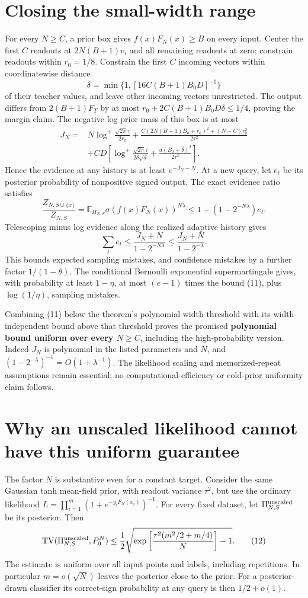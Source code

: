 \documentclass[11pt]{article}
\newcommand{\E}{\mathbb E}
\begin{document}
\section{Closing the small-width range}
For every $N\ge C$, a prior box gives $f(x)F_N(x)\ge B$ on every input.
Center the first $C$ readouts at $2N(B+1)v_i$ and all remaining readouts
at zero; constrain readouts within $r_0=1/8$. Constrain the first $C$
incoming vectors within coordinatewise distance
\[
       \delta=\min\{1,[16C(B+1)B_0D]^{-1}\}
\]
of their teacher values, and leave other incoming vectors unrestricted.
The output differs from $2(B+1)F_T$ by at most
$r_0+2C(B+1)B_0D\delta\le1/4$, proving the margin claim.
The negative log prior mass of this box is at most
\begin{align*}
 J_N={}&N\log^+\frac{\sqrt{2\pi}\tau}{2r_0}
 +\frac{C(2N(B+1)B_0+r_0)^2+(N-C)r_0^2}{2\tau^2}\\
 &+CD\left[\log^+\frac{\sqrt{2\pi}\tau}{2\delta\sqrt d}
                   +\frac{d(B_0+\delta)^2}{2\tau^2}\right].
\end{align*}
Hence the evidence at any history is at least $e^{-J_N-N}$.
At a new query, let $e_t$ be its posterior probability of nonpositive
signed output. The exact evidence ratio satisfies
\[
 \frac{Z_{N,S\cup\{x\}}}{Z_{N,S}}
 =\E_{\Pi_{N,S}}\sigma(f(x)F_N(x))^{N\lambda}
 \le1-(1-2^{-N\lambda})e_t.
\]
Telescoping minus log evidence along the realized adaptive history gives
\[
             \sum_t e_t\le\frac{J_N+N}{1-2^{-N\lambda}}
                         \le\frac{J_N+N}{1-2^{-\lambda}}.     \tag{11}
\]
This bounds expected sampling mistakes, and confidence mistakes by a
further factor $1/(1-\theta)$. The conditional Bernoulli exponential
supermartingale gives, with probability at least $1-\eta$, at most
$(e-1)$ times the bound (11), plus $\log(1/\eta)$, sampling mistakes.

Combining (11) below the theorem's polynomial width threshold with its
width-independent bound above that threshold proves the promised
\textbf{polynomial bound uniform over every $N\ge C$}, including the
high-probability version. Indeed $J_N$ is polynomial in the listed
parameters and $N$, and $(1-2^{-\lambda})^{-1}=O(1+\lambda^{-1})$.
The likelihood scaling and memorized-repeat assumptions remain essential;
no computational-efficiency or cold-prior uniformity claim follows.

\section{Why an unscaled likelihood cannot have this uniform guarantee}
The factor $N$ is substantive even for a constant target. Consider the
same Gaussian tanh mean-field prior, with readout variance $\tau^2$, but
use the ordinary likelihood
$L=\prod_{i=1}^m(1+e^{-y_iF_N(x_i)})^{-1}$.
For every fixed dataset, let $\Pi^{\rm unscaled}_{N,S}$ be its posterior.
Then
\[
 \operatorname{TV}(\Pi^{\rm unscaled}_{N,S},P_0^N)
 \le\frac12\sqrt{
       \exp\left[\frac{\tau^2(m^2/2+m/4)}N\right]-1}.       \tag{12}
\]
The estimate is uniform over all input points and labels, including
repetitions. In particular $m=o(\sqrt N)$ leaves the posterior close
to the prior. For a posterior-drawn classifier its correct-sign
probability at any query is then $1/2+o(1)$.
\end{document}

